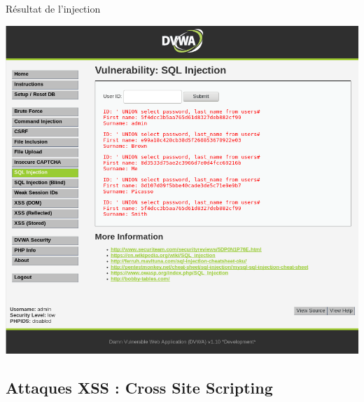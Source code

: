 \documentclass[8pt]{beamer}
\begin{document}
\begin{frame}{Résultat de l'injection}

\begin{center}
	\includegraphics[scale=.25]{../images/sql/sqli_low.png}
\end{center}

\end{frame}

\subsection{Attaques XSS : Cross Site Scripting}
\end{document}

